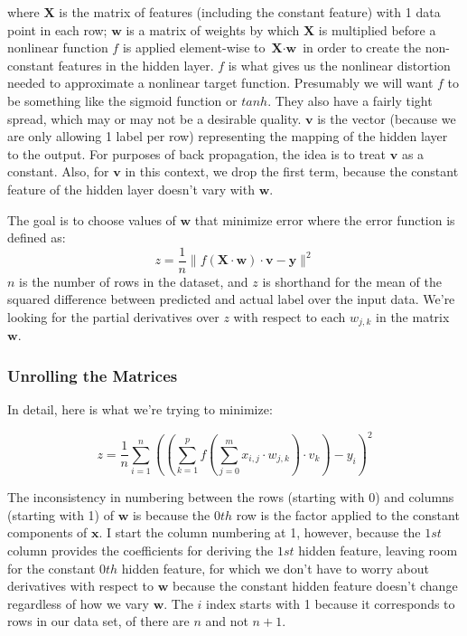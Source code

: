 \documentclass[11pt, oneside]{article}   	%
\begin{document}
where $\textbf{X}$ is the matrix of features (including the constant feature) with 1 data point in each row; $\textbf{w}$ is a matrix of weights by which $\textbf{X}$ is multiplied before a nonlinear function $f$  is applied element-wise to $\textbf{X} \cdot \textbf{w}$ in order to create the non-constant features in the hidden layer. $f$ is what gives us the nonlinear distortion needed to approximate a nonlinear target function. Presumably we will want $f$ to be something like the sigmoid function or $tanh$. They also have a fairly tight spread, which may or may not be a desirable quality. $\textbf{v}$ is the vector (because we are only allowing 1 label per row) representing the mapping of the hidden layer to the output. For purposes of back propagation, the idea is to treat $\textbf{v}$ as a constant. Also, for $\textbf{v}$ in this context, we drop the first term, because the constant feature of the hidden layer doesn't vary with $\textbf{w}$.

The goal is to choose values of $\textbf{w}$ that minimize error where the error function is defined as:
\begin{equation}
z = \frac{1}{n}  \parallel f(\textbf{X} \cdot \textbf{w}) \cdot \textbf{v} - \textbf{y} \parallel ^2
\end{equation}
$n$ is the number of rows in the dataset, and $z$ is shorthand for the mean of the squared difference between predicted and actual label over the input data. We're looking for the partial derivatives over $z$ with respect to each $w_{j,k}$ in the matrix
$\textbf{w}$.

\subsubsection{Unrolling the Matrices}

In detail, here is what we're trying to minimize:

\begin{equation}
z = \frac{1}{n} \sum\limits_{i = 1}^n ((\sum\limits_{k = 1}^p f(\sum\limits_{j = 0}^m x_{i,j} \cdot w_{j,k}) \cdot v_k) - y_i)^2
\end{equation}

The inconsistency in numbering between the rows (starting with 0) and columns (starting with 1) of $\textbf{w}$
is because the $0th$ row is the factor applied to the constant components of $\textbf{x}$. I start the column numbering at 1, however, because the $\textit{1st}$ column provides the coefficients for deriving the $\textit{1st}$ hidden feature, leaving room for the constant $0th$ hidden feature, for which we don't have to worry about derivatives with respect to $\textbf{w}$ because the constant hidden feature doesn't change regardless of how we vary $\textbf{w}$. The $i$ index starts with 1 because it corresponds to rows in our data set, of there are $n$ and not $n+1$.
\end{document}
